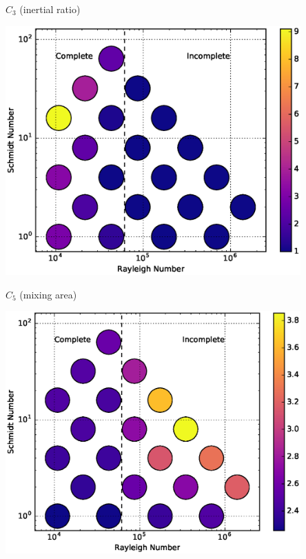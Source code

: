 \documentclass[12pt]{beamer}
\begin{document}
\begin{frame}[t]{$C_3$ (inertial ratio)}
\begin{center}
\vspace{-11pt}
\includegraphics[width=0.85\textwidth]{graphics/C3-vs-Rayleigh-Schmidt.eps}
\end{center}
\end{frame}

\begin{frame}[t]{$C_5$ (mixing area)}
\begin{center}
\vspace{-11pt}
\includegraphics[width=0.85\textwidth]{graphics/C5-vs-Rayleigh-Schmidt.eps}
\end{center}
\end{frame}
\end{document}
